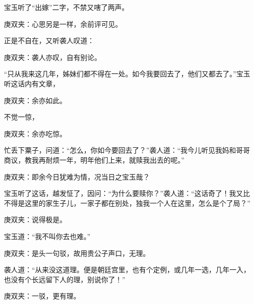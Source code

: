 \begin{parag}
    宝玉听了“出嫁”二字，不禁又嗐了两声。\begin{note}庚双夹：心思另是一样，余前评可见。\end{note}正是不自在，又听袭人叹道：\begin{note}庚双夹：袭人亦叹，自有别论。\end{note}“只从我来这几年，姊妹们都不得在一处。如今我要回去了，他们又都去了。”宝玉听这话内有文章，\begin{note}庚双夹：余亦如此。\end{note}不觉一惊，\begin{note}庚双夹：余亦吃惊。\end{note}忙丢下粟子，问道：“怎么，你如今要回去了？”袭人道：“我今儿听见我妈和哥哥商议，教我再耐烦一年，明年他们上来，就赎我出去的呢。”\begin{note}庚双夹：即余今日犹难为情，况当日之宝玉哉？\end{note}宝玉听了这话，越发怔了，因问：“为什么要赎你？”袭人道：“这话奇了！我又比不得是这里的家生子儿，一家子都在别处，独我一个人在这里，怎么是个了局？”\begin{note}庚双夹：说得极是。\end{note}宝玉道：“我不叫你去也难。”\begin{note}庚双夹：是头一句驳，故用贵公子声口，无理。\end{note}袭人道：“从来没这道理。便是朝廷宫里，也有个定例，或几年一选，几年一入，也没有个长远留下人的理，别说你了！”\begin{note}庚双夹：一驳，更有理。\end{note}
\end{parag}


